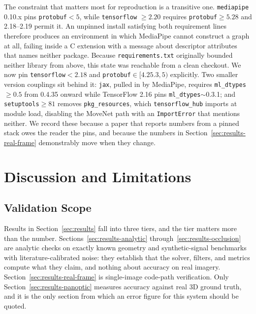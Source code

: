 \documentclass[conference]{IEEEtran}
\begin{document}
The constraint that matters most for reproduction is a transitive one.
\texttt{mediapipe} 0.10.x pins \texttt{protobuf}$<5$, while
\texttt{tensorflow} $\geq 2.20$ requires \texttt{protobuf}$\geq 5.28$ and
2.18--2.19 permit it. An unpinned install satisfying both requirement
lines therefore produces an environment in which MediaPipe cannot
construct a graph at all, failing inside a C extension with a message
about descriptor attributes that names neither package. Because
\texttt{requirements.txt} originally bounded neither library from above,
this state was reachable from a clean checkout. We now pin
\texttt{tensorflow}$<2.18$ and \texttt{protobuf}$\in[4.25.3,5)$
explicitly. Two smaller version couplings sit behind it: \texttt{jax},
pulled in by MediaPipe, requires \texttt{ml\_dtypes}$\geq0.5$ from 0.4.35
onward while TensorFlow 2.16 pins \texttt{ml\_dtypes}$\sim$0.3.1; and
\texttt{setuptools}$\geq81$ removes \texttt{pkg\_resources}, which
\texttt{tensorflow\_hub} imports at module load, disabling the MoveNet
path with an \texttt{ImportError} that mentions neither. We record these
because a paper that reports numbers from a pinned stack owes the reader
the pins, and because the numbers in
Section~\ref{sec:results-real-frame} demonstrably move when they change.

\section{Discussion and Limitations}
\label{sec:limitations}

\subsection{Validation Scope}
\label{sec:dataset-access}
Results in Section~\ref{sec:results} fall into three tiers, and the tier
matters more than the number. Sections~\ref{sec:results-analytic}
through~\ref{sec:results-occlusion} are analytic checks on exactly known
geometry and synthetic-signal benchmarks with literature-calibrated
noise: they establish that the solver, filters, and metrics compute what
they claim, and nothing about accuracy on real imagery.
Section~\ref{sec:results-real-frame} is single-image code-path
verification. Only Section~\ref{sec:results-panoptic} measures accuracy
against real 3D ground truth, and it is the only section from which an
error figure for this system should be quoted.
\end{document}
